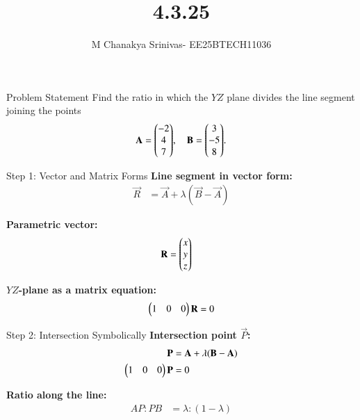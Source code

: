 \documentclass{beamer}
\title %
{4.3.25}
\date{}
\author %
{M Chanakya Srinivas- EE25BTECH11036}
\begin{document}
\frame{\titlepage}





\begin{frame}{Problem Statement}
Find the ratio in which the $YZ$ plane divides the line segment joining the points
$$
\mathbf{A} = \mathbf{\begin{pmatrix}-2\\4\\7\end{pmatrix}}, \quad 
\mathbf{B} = \mathbf{\begin{pmatrix}3\\-5\\8\end{pmatrix}}.
$$
\end{frame}

\begin{frame}{Step 1: Vector and Matrix Forms}
\textbf{Line segment in vector form:}
\begin{align}
\vec{R} &= \vec{A} + \lambda (\vec{B}-\vec{A}) \label{eq:line_vector}
\end{align}

\textbf{Parametric vector:}
\begin{align}
\mathbf{R} &= \mathbf{\begin{pmatrix}x\\y\\z\end{pmatrix}} \label{eq:R_vector}
\end{align}

\textbf{$YZ$-plane as a matrix equation:}
\begin{align}
\begin{pmatrix}1 & 0 & 0\end{pmatrix} \mathbf{R} = 0 \label{eq:YZ_matrix}
\end{align}
\end{frame}

\begin{frame}{Step 2: Intersection Symbolically}
\textbf{Intersection point $\vec{P}$:}
\begin{align}
\mathbf{P} &= \mathbf{A} + \lambda (\mathbf{B}-\mathbf{A}) \label{eq:P_vector} \\
\begin{pmatrix}1 & 0 & 0\end{pmatrix} \mathbf{P} &= 0 \label{eq:P_matrix}
\end{align}

\textbf{Ratio along the line:}
\begin{align}
AP : PB &= \lambda : (1-\lambda) \label{eq:ratio_vector}
\end{align}
\end{frame}
\end{document}
